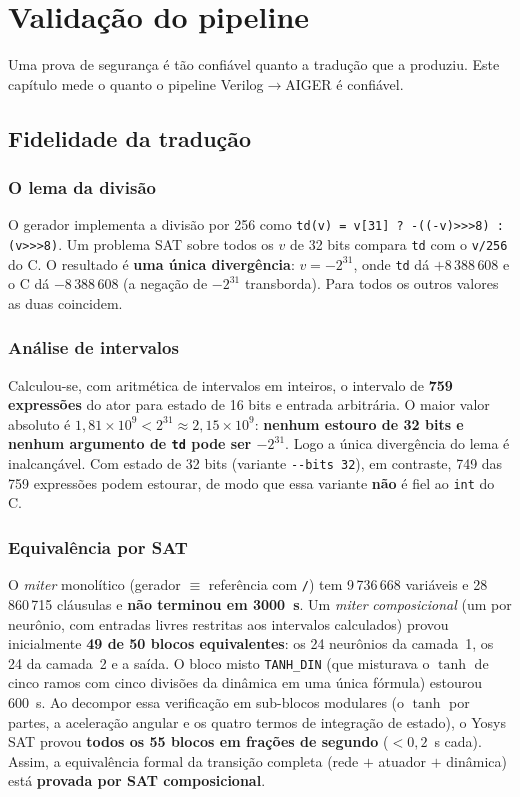 \documentclass[12pt,openright,oneside,a4paper,chapter=TITLE,sumario=tradicional,english,brazil]{abntex2}
\begin{document}
\section{Validação do pipeline}\label{cap:valid}

Uma prova de segurança é tão confiável quanto a tradução que a produziu. Este capítulo mede o quanto o pipeline Verilog$\to$AIGER é confiável.

\subsection{Fidelidade da tradução}

\subsubsection{O lema da divisão}

O gerador implementa a divisão por 256 como \texttt{td(v) = v[31] ? -((-v)>{}>{}>8) : (v>{}>{}>8)}. Um problema SAT sobre todos os $v$ de 32 bits compara \texttt{td} com o \texttt{v/256} do C. O resultado é \textbf{uma única divergência}: $v=-2^{31}$, onde \texttt{td} dá $+8\,388\,608$ e o C dá $-8\,388\,608$ (a negação de $-2^{31}$ transborda). Para todos os outros valores as duas coincidem.

\subsubsection{Análise de intervalos}

Calculou-se, com aritmética de intervalos em inteiros, o intervalo de \textbf{759 expressões} do ator para estado de 16 bits e entrada arbitrária. O maior valor absoluto é $1{,}81\times10^9<2^{31}\approx2{,}15\times10^9$: \textbf{nenhum estouro de 32 bits e nenhum argumento de \texttt{td} pode ser $-2^{31}$}. Logo a única divergência do lema é inalcançável. Com estado de 32 bits (variante \texttt{-{}-bits 32}), em contraste, 749 das 759 expressões podem estourar, de modo que essa variante \textbf{não} é fiel ao \texttt{int} do C.

\subsubsection{Equivalência por SAT}

O \emph{miter} monolítico (gerador $\equiv$ referência com \texttt{/}) tem 9\,736\,668 variáveis e 28\,860\,715 cláusulas e \textbf{não terminou em 3000~s}. Um \emph{miter} \emph{composicional} (um por neurônio, com entradas livres restritas aos intervalos calculados) provou inicialmente \textbf{49 de 50 blocos equivalentes}: os 24 neurônios da camada~1, os 24 da camada~2 e a saída. O bloco misto \texttt{TANH\_DIN} (que misturava o $\tanh$ de cinco ramos com cinco divisões da dinâmica em uma única fórmula) estourou 600~s. Ao decompor essa verificação em sub-blocos modulares (o $\tanh$ por partes, a aceleração angular e os quatro termos de integração de estado), o Yosys SAT provou \textbf{todos os 55 blocos em frações de segundo} ($<0{,}2$~s cada). Assim, a equivalência formal da transição completa (rede $+$ atuador $+$ dinâmica) está \textbf{provada por SAT composicional}.
\end{document}
